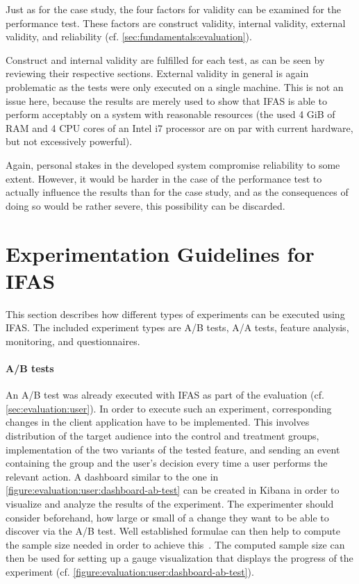 Just as for the case study, the four factors for validity can be examined for the performance test.
These factors are construct validity, internal validity, external validity, and reliability (cf. \cref{sec:fundamentals:evaluation}).

Construct and internal validity are fulfilled for each test, as can be seen by reviewing their respective sections.
External validity in general is again problematic as the tests were only executed on a single machine.
This is not an issue here, because the results are merely used to show that \ac{IFAS} is able to perform acceptably on a system with reasonable resources (the used 4 GiB of RAM and 4 CPU cores of an Intel i7 processor are on par with current hardware, but not excessively powerful).

Again, personal stakes in the developed system compromise reliability to some extent.
However, it would be harder in the case of the performance test to actually influence the results than for the case study, and as the consequences of doing so would be rather severe, this possibility can be discarded.

\section{Experimentation Guidelines for IFAS}

This section describes how different types of experiments can be executed using \ac{IFAS}.
The included experiment types are A/B tests, A/A tests, feature analysis, monitoring, and questionnaires.

\paragraph{A/B tests}
An A/B test was already executed with \ac{IFAS} as part of the evaluation (cf. \cref{sec:evaluation:user}).
In order to execute such an experiment, corresponding changes in the client application have to be implemented.
This involves distribution of the target audience into the control and treatment groups, implementation of the two variants of the tested feature, and sending an event containing the group and the user's decision every time a user performs the relevant action.
A dashboard similar to the one in \cref{figure:evaluation:user:dashboard-ab-test} can be created in Kibana in order to visualize and analyze the results of the experiment.
The experimenter should consider beforehand, how large or small of a change they want to be able to discover via the A/B test.
Well established formulae can then help to compute the sample size needed in order to achieve this~\cite{Kohavi2009,box2005statistics}.
The computed sample size can then be used for setting up a gauge visualization that displays the progress of the experiment (cf. \cref{figure:evaluation:user:dashboard-ab-test}).

